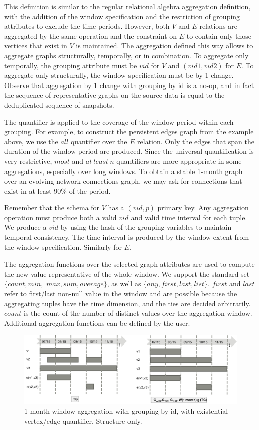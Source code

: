 This definition is similar to the regular relational algebra
aggregation definition, with the addition of the window specification
and the restriction of grouping attributes to exclude the time
periods.  However, both $V$ and $E$ relations are aggregated by the
same operation and the constraint on $E$ to contain only those
vertices that exist in $V$ is maintained.  The aggregation defined
this way allows to aggregate graphs structurally, temporally, or in
combination.  To aggregate only temporally, the grouping attribute
must be $vid$ for $V$ and $(vid1, vid2)$ for $E$.  To aggregate only
structurally, the window specification must be by 1 change.  Observe
that aggregation by 1 change with grouping by id is a no-op, and in
fact the sequence of representative graphs on the source data is equal
to the deduplicated sequence of snapshots.

The quantifier is applied to the coverage of the window period within
each grouping.  For example, to construct the persistent edges graph
from the example above, we use the $all$ quantifier over the $E$ relation.
Only the edges that span the duration of the window period are
produced.  Since the universal quantification is very restrictive,
$most$ and $at\ least\ n$ quantifiers are more appropriate in some
aggregations, especially over long windows.  To obtain a stable
1-month graph over an evolving network connections graph, we may ask
for connections that exist in at least 90\% of the period.

Remember that the schema for $V$ has a $(vid, p)$ primary key.  Any
aggregation operation must produce both a valid $vid$ and valid time
interval for each tuple.  We produce a $vid$ by using the hash of the
grouping variables to maintain temporal consistency.  The time
interval is produced by the window extent from the window
specification. Similarly for $E$.

The aggregation functions over the selected graph attributes are used
to compute the new value representative of the whole window.  We
support the standard set $\{count, min,$ $max, sum, average\}$, as
well as $\{any, first, last, list\}$.  $first$ and $last$ refer to
first/last non-null value in the window and are possible because the
aggregating tuples have the time dimension, and the ties are decided
arbitrarily.  $count$ is the count of the number of distinct values
over the aggregation window.  Additional aggregation functions can be
defined by the user.

\begin{figure}
\includegraphics[width=6.5in]{figs/agg1.pdf}
\caption{1-month window aggregation with grouping by id, with
  existential vertex/edge quantifier.  Structure only.}
\label{fig:agg1}
\end{figure}

